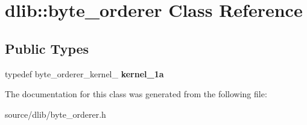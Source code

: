 \hypertarget{classdlib_1_1byte__orderer}{
\section{dlib::byte\_\-orderer Class Reference}
\label{classdlib_1_1byte__orderer}
}
\subsection*{Public Types}
\begin{DoxyCompactItemize}
\item 
\hypertarget{classdlib_1_1byte__orderer_aae9fdefa43755bb52b75f7a924f12737}{
typedef byte\_\-orderer\_\-kernel\_ {\bfseries kernel\_\-1a}}
\label{classdlib_1_1byte__orderer_aae9fdefa43755bb52b75f7a924f12737}

\end{DoxyCompactItemize}


The documentation for this class was generated from the following file:\begin{DoxyCompactItemize}
\item 
source/dlib/byte\_\-orderer.h\end{DoxyCompactItemize}
